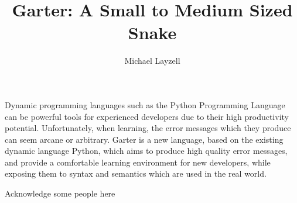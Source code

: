 






\title{Garter: A Small to Medium Sized Snake}

\author{Michael Layzell}



\beforepreface



Dynamic programming languages such as the Python Programming Language can be
powerful tools for experienced developers due to their high productivity
potential. Unfortunately, when learning, the error messages which they produce
can seem arcane or arbitrary. Garter is a new language, based on the existing
dynamic language Python, which aims to produce high quality error messages, and
provide a comfortable learning environment for new developers, while exposing
them to syntax and semantics which are used in the real world.



{}
Acknowledge some people here

\clearpage %


